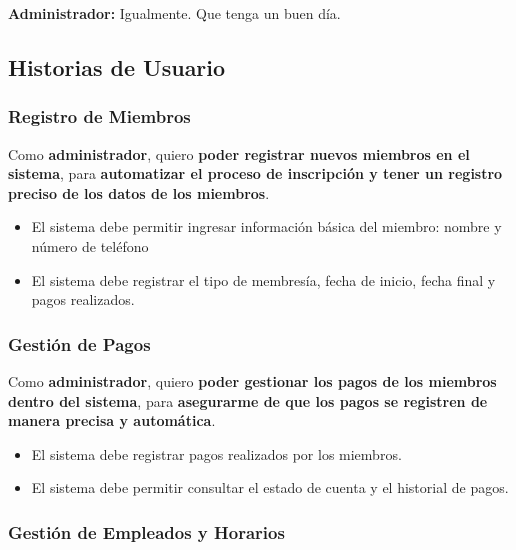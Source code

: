 \documentclass[spanish, 12pt]{article}
\providecommand{\tightlist}{\setlength{\itemsep}{0pt}
\setlength{\parskip}{0pt}}
\begin{document}
	\textbf{Administrador:} Igualmente. Que tenga un buen día.

	\subsection{Historias de Usuario}
	\label{historias-de-usuario-1}

	\subsubsection{Registro de Miembros}
	\label{registro-de-miembros-1}

	Como \textbf{administrador}, quiero \textbf{poder registrar nuevos miembros en
	el sistema}, para \textbf{automatizar el proceso de inscripción y tener un
	registro preciso de los datos de los miembros}.

	\begin{itemize}
		\tightlist

		\item El sistema debe permitir ingresar información básica del miembro:
			nombre y número de teléfono

		\item El sistema debe registrar el tipo de membresía, fecha de inicio, fecha
			final y pagos realizados.
	\end{itemize}

	\subsubsection{Gestión de Pagos}
	\label{gestiuxf3n-de-pagos}

	Como \textbf{administrador}, quiero \textbf{poder gestionar los pagos de los
	miembros dentro del sistema}, para \textbf{asegurarme de que los pagos se
	registren de manera precisa y automática}.

	\begin{itemize}
		\tightlist

		\item El sistema debe registrar pagos realizados por los miembros.

		\item El sistema debe permitir consultar el estado de cuenta y el historial de
			pagos.
	\end{itemize}

	\subsubsection{Gestión de Empleados y Horarios}
	\label{gestiuxf3n-de-empleados-y-horarios}
\end{document}
